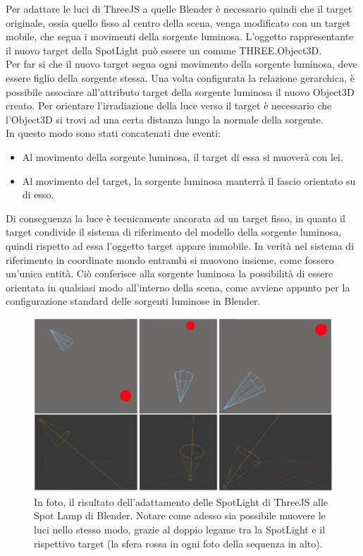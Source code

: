 Per adattare le luci di ThreeJS a quelle Blender è necessario quindi che il target originale, ossia quello fisso al centro della scena, venga modificato con un target mobile, che segua i movimenti della sorgente luminosa. L’oggetto rappresentante il nuovo target della SpotLight può essere un comune THREE.Object3D.
\\
Per far si che il nuovo target segua ogni movimento della sorgente luminosa, deve essere figlio della sorgente stessa. Una volta configurata la relazione gerarchica, è possibile associare all’attributo target della sorgente luminosa il nuovo Object3D creato. Per orientare l’irradiazione della luce verso il target è necessario che l’Object3D si trovi ad una certa distanza lungo la normale della sorgente.
\\
In questo modo sono stati concatenati due eventi:
\begin{itemize}
\item Al movimento della sorgente luminosa, il target di essa si muoverà con lei.
\item Al movimento del target, la sorgente luminosa manterrà il fascio orientato su di esso.
\end{itemize}
Di conseguenza la luce è tecnicamente ancorata ad un target fisso, in quanto il target condivide il sistema di riferimento del modello della sorgente luminosa, quindi rispetto ad essa l’oggetto target appare immobile. In verità nel sistema di riferimento in coordinate mondo entrambi si muovono insieme, come fossero un’unica entità. Ciò conferisce alla sorgente luminosa la possibilità di essere orientata in qualsiasi modo all’interno della scena, come avviene appunto per la configurazione standard delle sorgenti luminose in Blender.
\\
\begin{figure}[htb]
 \centering
 \includegraphics[width=1\linewidth]{images/chapter_creazione_scena/editor_6.png}\hfill
 \caption[Adattamento illuminazione]{In foto, il risultato dell'adattamento delle SpotLight di ThreeJS alle Spot Lamp di Blender. Notare come adesso sia possibile muovere le luci nello stesso modo, grazie al doppio legame tra la SpotLight e il rispettivo target (la sfera rossa in ogni foto della sequenza in alto).}
 \label{fig:editor_6}
\end{figure} 

